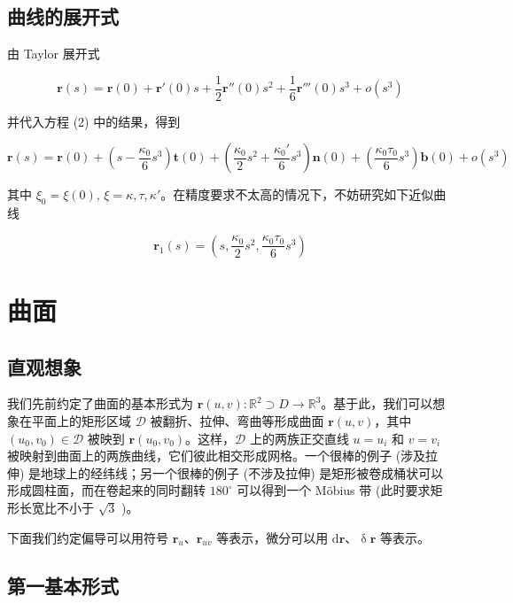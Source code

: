 \documentclass[a4paper, 12pt]{article}
\begin{document}
    \subsection{曲线的展开式}

    由 Taylor 展开式

    \[
    \boldsymbol r(s)=\boldsymbol r(0)+\boldsymbol r'(0)s+\frac{1}{2}\boldsymbol r''(0)s^2+\frac{1}{6}\boldsymbol r'''(0)s^3 +o(s^3)
    \]

    并代入方程 (2) 中的结果，得到

    \begin{equation}
        \boldsymbol r(s)=\boldsymbol r(0)+\left(s-\frac{\kappa_0}{6}s^3\right)\boldsymbol t(0)+\left(\frac{\kappa_0}{2}s^2+\frac{\kappa_0'}{6}s^3\right)\boldsymbol n(0)+\left(\frac{\kappa_0 \tau_0}{6}s^3\right)\boldsymbol b(0) + o(s^3)
    \end{equation}

    其中 $\xi_0=\xi(0),\,\xi=\kappa,\tau,\kappa'$。在精度要求不太高的情况下，不妨研究如下近似曲线

    \[
    \boldsymbol r_1 (s) = \left(s,\frac{\kappa_0}{2}s^2,\frac{\kappa_0\tau_0}{6}s^3\right)
    \]

    \section{曲面}

    \subsection{直观想象}

    我们先前约定了曲面的基本形式为 $\boldsymbol r(u,v):\mathbb R^2 \supset D \to \mathbb R^3$。基于此，我们可以想象在平面上的矩形区域 $\mathcal D$ 被翻折、拉伸、弯曲等形成曲面 $\boldsymbol r(u,v)$，其中 $(u_0,v_0)\in\mathcal D$ 被映到 $\boldsymbol r(u_0,v_0)$。这样，$\mathcal D$ 上的两族正交直线 $u=u_i$ 和 $v=v_i$ 被映射到曲面上的两族曲线，它们彼此相交形成网格。一个很棒的例子 (涉及拉伸) 是地球上的经纬线；另一个很棒的例子 (不涉及拉伸) 是矩形被卷成桶状可以形成圆柱面，而在卷起来的同时翻转 $180^\circ$ 可以得到一个 Möbius 带 (此时要求矩形长宽比不小于 $\sqrt 3$ )。

    下面我们约定偏导可以用符号 $\boldsymbol r_u$、$\boldsymbol r_{uv}$ 等表示，微分可以用 $\mathrm d\boldsymbol r$、$\updelta \boldsymbol r$ 等表示。

    \subsection{第一基本形式}
\end{document}
